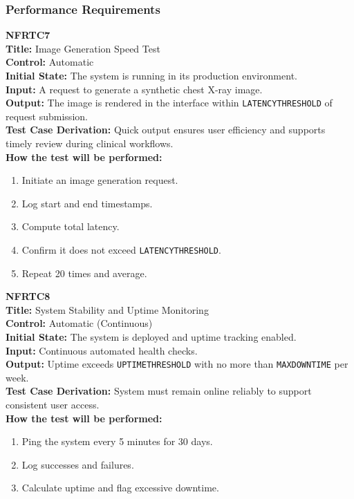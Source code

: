 \documentclass[12pt, titlepage]{article}
\begin{document}
\vspace{1em}
\subsubsection{Performance Requirements}

\textbf{NFRTC7}\\
\textbf{Title:} Image Generation Speed Test\\
\textbf{Control:} Automatic\\
\textbf{Initial State:} The system is running in its production environment.\\
\textbf{Input:} A request to generate a synthetic chest X-ray image.\\
\textbf{Output:} The image is rendered in the interface within \verb|LATENCYTHRESHOLD| of request submission.\\
\textbf{Test Case Derivation:} Quick output ensures user efficiency and supports timely review during clinical workflows.\\
\textbf{How the test will be performed:}
\begin{enumerate}
  \item Initiate an image generation request.
  \item Log start and end timestamps.
  \item Compute total latency.
  \item Confirm it does not exceed \verb|LATENCYTHRESHOLD|.
  \item Repeat 20 times and average.
\end{enumerate}

\vspace{1em}

\textbf{NFRTC8}\\
\textbf{Title:} System Stability and Uptime Monitoring\\
\textbf{Control:} Automatic (Continuous)\\
\textbf{Initial State:} The system is deployed and uptime tracking enabled.\\
\textbf{Input:} Continuous automated health checks.\\
\textbf{Output:} Uptime exceeds \verb|UPTIMETHRESHOLD| with no more than \verb|MAXDOWNTIME| per week.\\
\textbf{Test Case Derivation:} System must remain online reliably to support consistent user access.\\
\textbf{How the test will be performed:}
\begin{enumerate}
  \item Ping the system every 5 minutes for 30 days.
  \item Log successes and failures.
  \item Calculate uptime and flag excessive downtime.
\end{enumerate}
\end{document}
